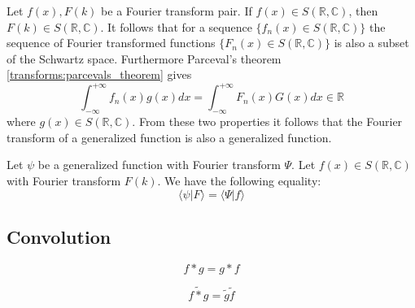 	\begin{theorem}
		Let $f(x), F(k)$ be a Fourier transform pair. If $f(x)\in S(\mathbb{R},\mathbb{C})$, then $F(k)\in S(\mathbb{R},\mathbb{C})$. It follows that for a sequence $\{f_n(x)\in S(\mathbb{R},\mathbb{C})\}$ the sequence of Fourier transformed functions $\{F_n(x)\in S(\mathbb{R},\mathbb{C})\}$ is also a subset of the Schwartz space. Furthermore Parceval's theorem \ref{transforms:parcevals_theorem} gives \[\int_{-\infty}^{+\infty}f_n(x)g(x)dx = \int_{-\infty}^{+\infty}F_n(x)G(x)dx\in\mathbb{R}\] where $g(x)\in S(\mathbb{R},\mathbb{C})$. From these two properties it follows that the Fourier transform of a generalized function is also a generalized function.
	\end{theorem}
    
	\begin{property}
		Let $\psi$ be a generalized function with Fourier transform $\Psi$. Let $f(x)\in S(\mathbb{R},\mathbb{C})$ with Fourier transform $F(k)$. We have the following equality:
        \begin{equation}
			\langle \psi|F \rangle = \langle \Psi|f \rangle
		\end{equation}
	\end{property}

\subsection{Convolution}

        
        \begin{property}[Commutativity]
		\begin{equation}
			f \ast g = g \ast f
	        \end{equation}
	\end{property}
        
        \begin{theorem}
		\begin{equation}
			\widetilde{f \ast g} = \widetilde{g} \widetilde{f}
	        \end{equation}
	\end{theorem}


